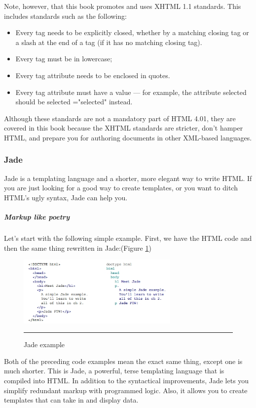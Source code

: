 Note, however, that this book promotes and uses XHTML 1.1 standards. This includes standards
such as the following:

\begin{itemize}
  \item Every tag needs to be explicitly closed, whether by a matching closing tag or a slash at the
end of a tag (if it has no matching closing tag).
  \item Every tag must be in lowercase; 
  \item Every tag attribute needs to be enclosed in quotes.
  \item Every tag attribute must have a value — for example, the attribute selected should be
selected ="selected" instead.
\end{itemize}
Although these standards are not a mandatory part of HTML 4.01, they are covered in this book
because the XHTML standards are stricter, don’t hamper HTML, and prepare you for authoring
documents in other XML-based languages.\cite{2}

\subsubsection{Jade}
Jade is a templating language and a shorter, more elegant way to write HTML. If you
are just looking for a good way to create templates, or you want to ditch HTML's
ugly syntax, Jade can help you.\cite{2}
\subparagraph*{Markup like poetry}
\hfill \break
Let's start with the following simple example. First, we have the HTML code and then
the same thing rewritten in Jade:(Figure \ref{fig:jade})
\begin{figure}[h!]
  \centering
    \includegraphics[width=0.7\textwidth]{./Pictures/jade.jpg}
  \rule{0.7\textwidth}{1pt}
 \caption{Jade example}
  \label{fig:jade}
\end{figure}


Both of the preceding code examples mean the exact same thing, except one is
much shorter. This is Jade, a powerful, terse templating language that is compiled
into HTML. In addition to the syntactical improvements, Jade lets you simplify
redundant markup with programmed logic. Also, it allows you to create templates
that can take in and display data.\cite{2}

